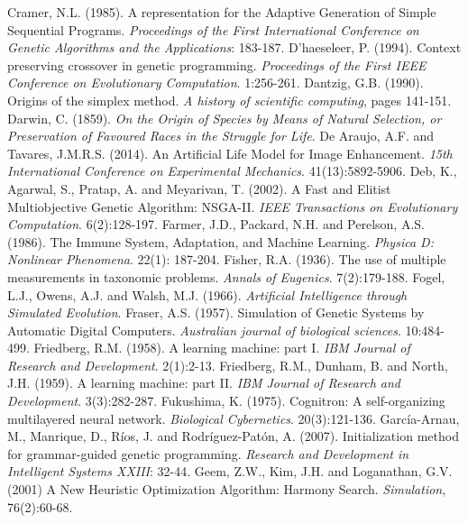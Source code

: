 \documentclass[spanish,a4paper,12pt,twoside]{report}
\begin{document}
\begin{thebibliography}{00}
   Cramer, N.L. (1985). A representation for the Adaptive Generation of Simple Sequential Programs. \emph{Proceedings of the First International Conference on Genetic Algorithms and the Applications}: 183-187.
   D'haeseleer, P. (1994). Context preserving crossover in genetic programming. \emph{Proceedings of the First IEEE Conference on Evolutionary Computation}. 1:256-261.
   Dantzig, G.B. (1990). Origins of the simplex method. \emph{A history of scientific computing}, pages 141-151.
   Darwin, C. (1859). \emph{On the Origin of Species by Means of Natural Selection, or Preservation of Favoured Races in the Struggle for Life}. 
   De Araujo, A.F. and Tavares, J.M.R.S. (2014). An Artificial Life Model for Image Enhancement. \emph{15th International Conference on Experimental Mechanics}. 41(13):5892-5906.
   Deb, K., Agarwal, S., Pratap, A. and Meyarivan, T. (2002). A Fast and Elitist Multiobjective Genetic Algorithm: NSGA-II. \emph{IEEE Transactions on Evolutionary Computation}. 6(2):128-197.
   Farmer, J.D., Packard, N.H. and Perelson, A.S. (1986). The Immune System, Adaptation, and Machine Learning. \emph{Physica D: Nonlinear Phenomena}. 22(1): 187-204.
   Fisher, R.A. (1936). The use of multiple measurements in taxonomic problems. \emph{Annals of Eugenics}. 7(2):179-188.
   Fogel, L.J., Owens, A.J. and Walsh, M.J. (1966). \emph{Artificial Intelligence through Simulated Evolution}.
   Fraser, A.S. (1957). Simulation of Genetic Systems by Automatic Digital Computers. \emph{Australian journal of biological sciences}. 10:484-499.
   Friedberg, R.M. (1958). A learning machine: part I. \emph{IBM Journal of Research and Development}. 2(1):2-13.
   Friedberg, R.M., Dunham, B. and North, J.H. (1959). A learning machine: part II. \emph{IBM Journal of Research and Development}. 3(3):282-287.
   Fukushima, K. (1975). Cognitron: A self-organizing multilayered neural network. \emph{Biological Cybernetics}. 20(3):121-136.
   García-Arnau, M., Manrique, D., Ríos, J. and Rodríguez-Patón, A. (2007). Initialization method for grammar-guided genetic programming. \emph{Research and Development in Intelligent Systems XXIII}: 32-44.
   Geem, Z.W., Kim, J.H. and Loganathan, G.V. (2001) A New Heuristic Optimization Algorithm: Harmony Search. \emph{Simulation}, 76(2):60-68.

\end{thebibliography}
\end{document}
